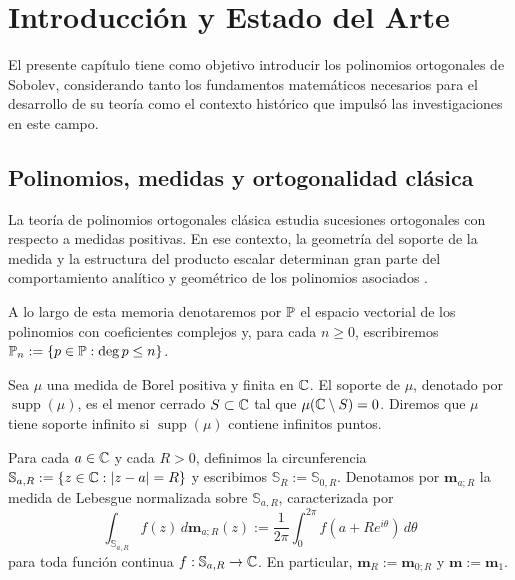 \chapter{Introducción y Estado del Arte}\label{sec:intro}

El presente capítulo tiene como objetivo introducir los polinomios ortogonales de Sobolev, considerando tanto los fundamentos matemáticos necesarios para el desarrollo de su teoría como el contexto histórico que impulsó las investigaciones en este campo.

\section{Polinomios, medidas y ortogonalidad clásica}
\label{sec:preliminares_ortogonalidad}

La teoría de polinomios ortogonales clásica estudia sucesiones ortogonales con
respecto a medidas positivas. En ese contexto, la geometría del soporte de la
medida y la estructura del producto escalar determinan gran parte del
comportamiento analítico y geométrico de los polinomios asociados
\cite{Chi78,szego1975orthogonal}.

A lo largo de esta memoria denotaremos por \(\mathbb{P}\) el espacio vectorial de los
polinomios con coeficientes complejos y, para cada \(n\ge 0\), escribiremos
\(\mathbb{P}_n:=\{p\in\mathbb{P}:\deg p\le n\}\).

\begin{defn}\label{def:medida_soporte}
	Sea \(\mu\) una medida de Borel positiva y finita en \(\mathbb{C}\). El soporte de
	\(\mu\), denotado por \(\operatorname{supp}(\mu)\), es el menor cerrado
	\(S\subset\mathbb{C}\) tal que \(\mu(\mathbb{C}\setminus S)=0\).
	Diremos que \(\mu\) tiene soporte infinito si \(\operatorname{supp}(\mu)\)
	contiene infinitos puntos.
\end{defn}

\begin{defn}\label{def:circulos_medidas_normalizadas}
	Para cada \(a\in\mathbb{C}\) y cada \(R>0\), definimos la circunferencia
	\(\mathbb S_{a,R}:=\{z\in\mathbb{C}:|z-a|=R\}\) y escribimos
	\(\mathbb S_R:=\mathbb S_{0,R}\).
	Denotamos por \(\mathbf m_{a;R}\) la medida de Lebesgue normalizada sobre
	\(\mathbb S_{a,R}\), caracterizada por
	\[
		\int_{\mathbb S_{a,R}} f(z)\,d\mathbf m_{a;R}(z)
		:=
		\frac{1}{2\pi}\int_0^{2\pi} f(a+Re^{i\theta})\,d\theta
	\]
	para toda función continua \(f:\mathbb S_{a,R}\to\mathbb{C}\). En particular,
	\(\mathbf m_R:=\mathbf m_{0;R}\) y \(\mathbf m:=\mathbf m_1\).
\end{defn}

